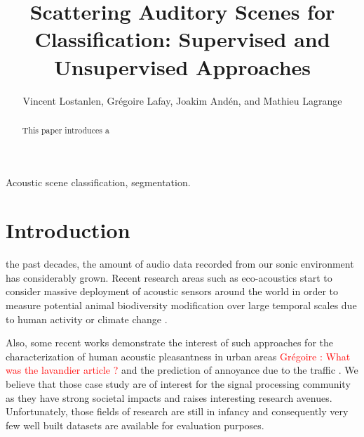 \documentclass[journal]{IEEEtran}
\newcommand{\gl}[1]{\textcolor{red}{Gr\'egoire : #1}}
\begin{document}
%
\title{Scattering Auditory Scenes for Classification: Supervised and Unsupervised Approaches}

\author{Vincent Lostanlen, Gr\'egoire Lafay, Joakim And\'en, and Mathieu Lagrange}


\maketitle

\begin{abstract}
This paper introduces a 
\end{abstract}

\begin{IEEEkeywords}
Acoustic scene classification, segmentation.
\end{IEEEkeywords}






%
\IEEEpeerreviewmaketitle

\section{Introduction}

 the past decades, the amount of audio data recorded from our sonic environment has considerably grown. Recent research areas such as eco-acoustics \cite{ECOACOUSTICS2014, krause} start to consider massive deployment of acoustic sensors around the world in order to measure potential animal biodiversity modification over large temporal scales due to human activity or climate change \cite{NessSST13, stowell13a, stowell13b}. 

Also, some recent works demonstrate the interest of such approaches for the characterization of human acoustic pleasantness in urban areas \cite{lafayPartI, guyot2005urban, ricciardi2015sound} \gl{What was the lavandier article ?} and the prediction of annoyance due to the traffic \cite{gloaguen}. We believe that those case study are of interest for the signal processing community as they have strong societal impacts and raises interesting research avenues. Unfortunately, those fields of research are still in infancy and consequently very few well built datasets are available for evaluation purposes. 
\end{document}
